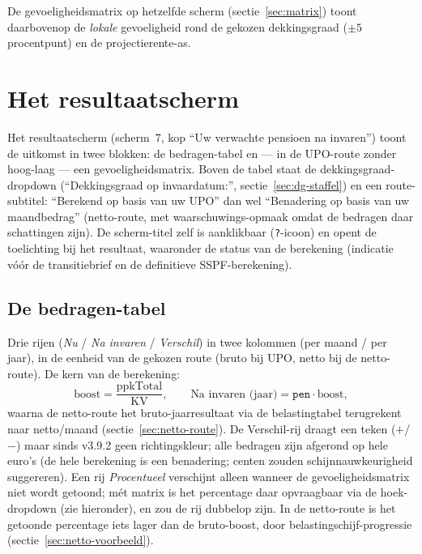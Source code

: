 \documentclass[11pt,a4paper]{article}
\newcommand{\ppktot}{\text{ppkTotal}}
\newcommand{\code}[1]{\texttt{#1}}
\begin{document}
De gevoeligheidsmatrix op hetzelfde scherm (sectie~\ref{sec:matrix}) toont daarbovenop de \emph{lokale} gevoeligheid rond de gekozen dekkingsgraad ($\pm 5$ procentpunt) en de projectierente-as.

\section{Het resultaatscherm}
\label{sec:resultaat}

Het resultaatscherm (scherm~7, kop ``Uw verwachte pensioen na invaren'') toont de uitkomst in twee blokken: de bedragen-tabel en --- in de UPO-route zonder hoog-laag --- een gevoeligheidsmatrix. Boven de tabel staat de dekkingsgraad-dropdown (``Dekkingsgraad op invaardatum:'', sectie~\ref{sec:dg-staffel}) en een route-subtitel: ``Berekend op basis van uw UPO'' dan wel ``Benadering op basis van uw maandbedrag'' (netto-route, met waarschuwings-opmaak omdat de bedragen daar schattingen zijn). De scherm-titel zelf is aanklikbaar (\code{?}-icoon) en opent de toelichting bij het resultaat, waaronder de status van de berekening (indicatie vóór de transitiebrief en de definitieve SSPF-berekening).

\subsection{De bedragen-tabel}

Drie rijen (\emph{Nu} / \emph{Na invaren} / \emph{Verschil}) in twee kolommen (per maand / per jaar), in de eenheid van de gekozen route (bruto bij UPO, netto bij de netto-route). De kern van de berekening:
\begin{equation}
\text{boost} = \frac{\ppktot}{\text{KV}}, \qquad
\text{Na invaren (jaar)} = \code{pen} \cdot \text{boost},
\end{equation}
waarna de netto-route het bruto-jaarresultaat via de belastingtabel terugrekent naar netto/maand (sectie~\ref{sec:netto-route}). De Verschil-rij draagt een teken ($+$/$-$) maar sinds v3.9.2 geen richtingskleur; alle bedragen zijn afgerond op hele euro's (de hele berekening is een benadering; centen zouden schijnnauwkeurigheid suggereren). Een rij \emph{Procentueel} verschijnt alleen wanneer de gevoeligheidsmatrix niet wordt getoond; mét matrix is het percentage daar opvraagbaar via de hoek-dropdown (zie hieronder), en zou de rij dubbelop zijn. In de netto-route is het getoonde percentage iets lager dan de bruto-boost, door belastingschijf-progressie (sectie~\ref{sec:netto-voorbeeld}).
\end{document}
